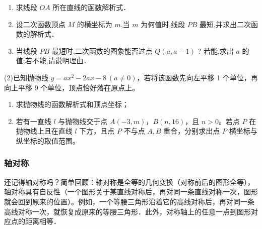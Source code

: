 \begin{minipage}{1\linewidth}
\begin{minipage}{1\linewidth}
\begin{exercise}
\begin{multicols}{2}
    \begin{enumerate}
        \item 求线段 \( OA \) 所在直线的函数解析式．
        \item 设二次函数顶点 \( M \) 的横坐标为 \( m \),当 \( m \) 为何值时,线段 \( PB \) 最短,并求出二次函数的解析式．
        \item 当线段 \( PB \) 最短时,二次函数的图象能否过点 \( Q(a,a-1) \) ? 若能,求出 \( a \) 的值;若不能,请说明理由．
    \end{enumerate}




    (2)已知抛物线 \( y = ax^2 - 2ax - 8 \ (a \neq 0) \)，若将该函数先向左平移 1 个单位，再向上平移 9 个单位，顶点恰好落在原点上。

    \begin{enumerate}
        \item 求抛物线的函数解析式和顶点坐标；
        \item 若有一直线 \( l \) 与抛物线交于点 \( A(-3, m) \)，\( B(n, 16) \)，且 \( n > 0 \)。若点 \( P \) 在抛物线上且在直线 \( l \) 下方，且点 \( P \) 不与点 \( A, B \) 重合，分别求出点 \( P \) 横坐标与纵坐标的取值范围。
    \end{enumerate}
    
    \end{multicols}
    \end{exercise}
    \end{minipage}
\end{minipage}
    










\subsubsection*{轴对称}

还记得轴对称吗？简单回顾：轴对称是全等的几何变换（对称前后的图形全等），轴对称具有自反性（一个图形关于某直线对称后，再对同一条直线对称一次，图形就会回到原来的位置）。例如，一个等腰三角形沿着它的高线对称后，再对同一条高线对称一次，就恢复成原来的等腰三角形．此外，对称轴上的任意一点到图形对应点的距离相等．
\par

